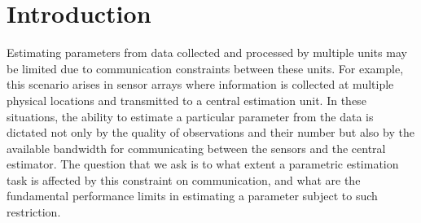\documentclass[letterpaper, 11pt]{IEEEtran}      %
\begin{document}
\section{Introduction}
\label{sec:Intro}
Estimating parameters from data collected and processed by multiple units may be limited due to communication constraints between these units. 
%
For example, this scenario arises in sensor arrays where information is collected at multiple physical locations and transmitted to a central estimation unit. In these situations, the ability to estimate a particular parameter from the data is dictated not only by the quality of observations and their number but also by the available bandwidth for communicating between the sensors and the central estimator. The question that we ask is to what extent a parametric estimation task is affected by this constraint on communication, and what are the fundamental performance limits in estimating a parameter subject to such restriction. \par
\end{document}
